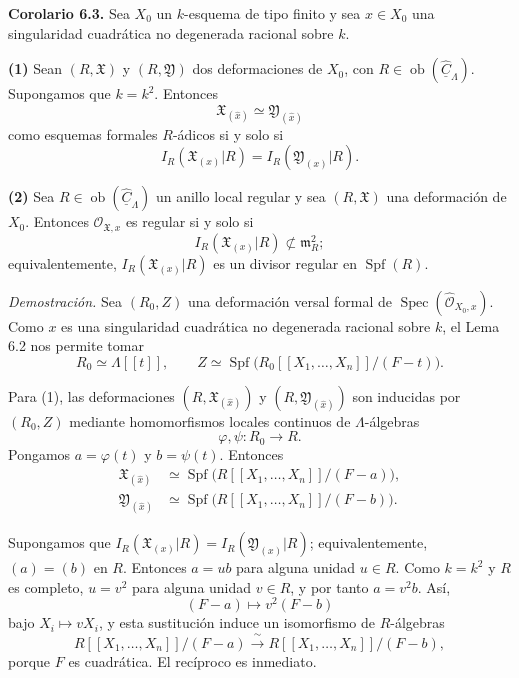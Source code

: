 \par\medskip
\noindent\textbf{Corolario 6.3.}
Sea $X_0$ un $k$-esquema de tipo finito y sea $x\in X_0$ una
singularidad cuadrática no degenerada racional sobre $k$.

\smallskip
\noindent\textbf{(1)} Sean $(R,\mathfrak X)$ y
$(R,\mathfrak Y)$ dos deformaciones de $X_0$, con
$R\in\operatorname{ob}(\widehat{\underline C}_\Lambda)$. Supongamos
que $k=k^2$. Entonces
\[
\mathfrak X_{(\widehat x)}\simeq
\mathfrak Y_{(\widehat x)}
\]
como esquemas formales $R$-ádicos si y solo si
\[
I_R(\mathfrak X_{(x)}|R)=I_R(\mathfrak Y_{(x)}|R).
\]

\smallskip
\noindent\textbf{(2)} Sea
$R\in\operatorname{ob}(\widehat{\underline C}_\Lambda)$ un anillo
local regular y sea $(R,\mathfrak X)$ una deformación de $X_0$.
Entonces $\mathcal O_{\mathfrak X,x}$ es regular si y solo si
\[
I_R(\mathfrak X_{(x)}|R)\not\subset\mathfrak m_R^2;
\]
equivalentemente, $I_R(\mathfrak X_{(x)}|R)$ es un divisor regular en
$\operatorname{Spf}(R)$.

\smallskip
\noindent\textit{Demostración.}
Sea $(R_0,Z)$ una deformación versal formal de
$\operatorname{Spec}(\widehat{\mathcal O}_{X_0,x})$. Como $x$ es una
singularidad cuadrática no degenerada racional sobre $k$, el Lema 6.2
nos permite tomar
\[
R_0\simeq\Lambda[[t]],
\qquad
Z\simeq\operatorname{Spf}
 \bigl(R_0[[X_1,\ldots,X_n]]/(F-t)\bigr).
\]

Para (1), las deformaciones
$(R,\mathfrak X_{(\widehat x)})$ y
$(R,\mathfrak Y_{(\widehat x)})$ son inducidas por $(R_0,Z)$ mediante
homomorfismos locales continuos de $\Lambda$-álgebras
\[
\varphi,\psi:R_0\longrightarrow R.
\]
Pongamos $a=\varphi(t)$ y $b=\psi(t)$. Entonces
\[
\begin{aligned}
\mathfrak X_{(\widehat x)}
&\simeq\operatorname{Spf}
 \bigl(R[[X_1,\ldots,X_n]]/(F-a)\bigr),\\
\mathfrak Y_{(\widehat x)}
&\simeq\operatorname{Spf}
 \bigl(R[[X_1,\ldots,X_n]]/(F-b)\bigr).
\end{aligned}
\]


Supongamos que
$I_R(\mathfrak X_{(x)}|R)=I_R(\mathfrak Y_{(x)}|R)$;
equivalentemente, $(a)=(b)$ en $R$. Entonces $a=ub$ para alguna
unidad $u\in R$. Como $k=k^2$ y $R$ es completo, $u=v^2$ para alguna
unidad $v\in R$, y por tanto $a=v^2b$. Así,
\[
(F-a)\longmapsto v^2(F-b)
\]
bajo $X_i\mapsto vX_i$, y esta sustitución induce un isomorfismo de
$R$-álgebras
\[
R[[X_1,\ldots,X_n]]/(F-a)
 \xrightarrow{\ \sim\ }
R[[X_1,\ldots,X_n]]/(F-b),
\]
porque $F$ es cuadrática. El recíproco es inmediato.

